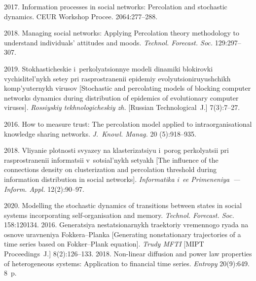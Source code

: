 \begin{multicols}{2}
{{\begin{thebibliography}{99}
 2017. Information processes in 
social networks: Percolation and stochastic dynamics. CEUR Workshop Procee.
2064:277--288.

 2018. Managing social networks: 
Applying Percolation theory methodology to understand individuals' attitudes and moods. 
\textit{Technol. Forecast. Soc.} 129:297--307.


 2019. Stokhasticheskie 
i~perkolyatsionnye modeli dinamiki blokirovki vychislitel'nykh setey pri rasprostranenii epidemiy 
evolyutsioniruyushchikh komp'yuternykh virusov [Stochastic and percolating models of blocking 
computer networks dynamics during distribution of epidemics of evolutionary computer viruses]. 
\textit{Rossiyskiy tekh\-no\-lo\-gi\-che\-skiy zh.} [Russian Technological~J.] 7(3):7--27.


 2016. How to measure trust: The 
percolation model applied to intraorganisational knowledge sharing networks. \textit{J.~Knowl. 
Manag.} 20 (5):918--935.

 2018. Vliyanie 
plotnosti svyazey na klasterizatsiyu i~porog perkolyatsii pri rasprostranenii informatsii 
v~sotsial'nykh setyakh [The influence of the connections density on clusterization and percolation 
threshold during information distribution in social networks]. \textit{Informatika i~ee 
Primeneniya~---Inform. Appl.} 12(2):90--97.

 2020. Modelling the 
stochastic dynamics of transitions between states in social systems incorporating self-organisation 
and memory. \textit{Technol. Forecast. Soc.} 158:120134.
 2016. Generatsiya ne\-sta\-tsio\-nar\-nykh traektoriy 
vremennogo ryada na osnove uravneniya Fokkera--Planka [Generating nonstationary trajectories 
of a time series based on Fokker--Plank equation]. \textit{Trudy MFTI} [MIPT Proceedings~J.] 
8(2):126--133.
 2018. Non-linear diffusion and power law properties of heterogeneous systems: 
Application to financial time series. \textit{Entropy} 20(9):649. 8~p.
\end{thebibliography}

 }
 }

\end{multicols}

